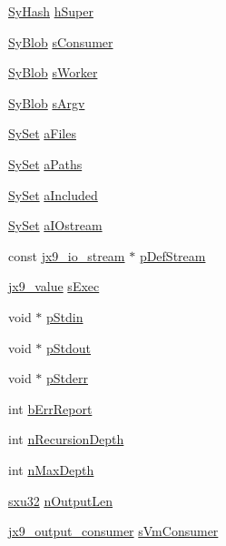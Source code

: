 \begin{DoxyCompactItemize}
\item 
\hyperlink{struct_sy_hash}{Sy\-Hash} \hyperlink{structjx9__vm_af7a71c8786cfa5fee211a4181f600a28}{h\-Super}
\item 
\hyperlink{struct_sy_blob}{Sy\-Blob} \hyperlink{structjx9__vm_a71bda441e53827df781cb6e573682cc3}{s\-Consumer}
\item 
\hyperlink{struct_sy_blob}{Sy\-Blob} \hyperlink{structjx9__vm_a8a4256f53aa19fa8aa84ec7fab4f4b7d}{s\-Worker}
\item 
\hyperlink{struct_sy_blob}{Sy\-Blob} \hyperlink{structjx9__vm_acd33768c1489726b5cf61ed58461526b}{s\-Argv}
\item 
\hyperlink{struct_sy_set}{Sy\-Set} \hyperlink{structjx9__vm_ad06a03f8cfd4577aedcf8a4572edbe25}{a\-Files}
\item 
\hyperlink{struct_sy_set}{Sy\-Set} \hyperlink{structjx9__vm_a2334b4ce90b4310d3b3b2eb7ad5cd5e0}{a\-Paths}
\item 
\hyperlink{struct_sy_set}{Sy\-Set} \hyperlink{structjx9__vm_a5715c45b87d2a86df02ac197e5618dd7}{a\-Included}
\item 
\hyperlink{struct_sy_set}{Sy\-Set} \hyperlink{structjx9__vm_af9f5593feb3207da87937add7b01a09c}{a\-I\-Ostream}
\item 
const \hyperlink{structjx9__io__stream}{jx9\-\_\-io\-\_\-stream} $\ast$ \hyperlink{structjx9__vm_ae81b7c03ba55caff75ca8b56157df30b}{p\-Def\-Stream}
\item 
\hyperlink{structjx9__value}{jx9\-\_\-value} \hyperlink{structjx9__vm_a23338c5736957522f22b3c6f6ae423bd}{s\-Exec}
\item 
void $\ast$ \hyperlink{structjx9__vm_aa91c43a67d12092db81464d1e0773b76}{p\-Stdin}
\item 
void $\ast$ \hyperlink{structjx9__vm_a9610c610bfa738c8637ea206c4a26ef1}{p\-Stdout}
\item 
void $\ast$ \hyperlink{structjx9__vm_a00249ae003ef89c4102e8c23dbb0d21c}{p\-Stderr}
\item 
int \hyperlink{structjx9__vm_a68b7b7d595aa65729b0c610f21349663}{b\-Err\-Report}
\item 
int \hyperlink{structjx9__vm_ac17f83fa2c07542d6e6af1b641aee597}{n\-Recursion\-Depth}
\item 
int \hyperlink{structjx9__vm_afdb189a7412b32c721700240c8ff1ec3}{n\-Max\-Depth}
\item 
\hyperlink{unqlite_8c_abc5a8a3f345c200c98c485551f49666e}{sxu32} \hyperlink{structjx9__vm_a64a310c793f53a77a43b5e71cf3549ed}{n\-Output\-Len}
\item 
\hyperlink{structjx9__output__consumer}{jx9\-\_\-output\-\_\-consumer} \hyperlink{structjx9__vm_aadebd05ff60669500cb4068036b55251}{s\-Vm\-Consumer}

\end{DoxyCompactItemize}
